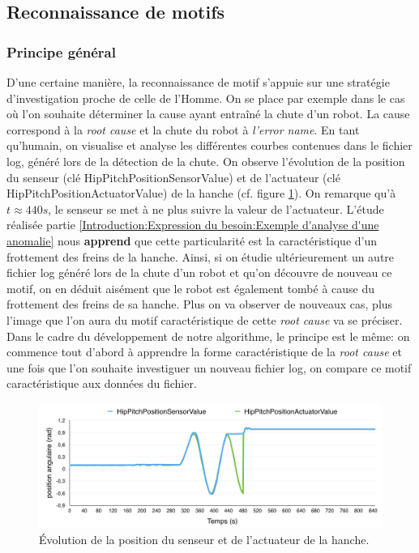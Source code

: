 \subsection{Reconnaissance de motifs}
\label{Automatisation du processus d'investigation: Reconnaissance de motifs}

\subsubsection{Principe général}
\label{Automatisation du processus d'investigation: Reconnaissance de motifs: Principes généraux}
D'une certaine manière, la reconnaissance de motif s'appuie sur une stratégie d'investigation proche de celle de l'Homme. On se place par exemple dans le cas où l'on souhaite déterminer la cause ayant entraîné la chute d'un robot. La cause correspond à la \emph{root cause} et la chute du robot à \emph{l'error name}. En tant qu'humain, on visualise et analyse les différentes courbes contenues dans le fichier log, généré lors de la détection de la chute. On observe l'évolution de la position du senseur (clé HipPitchPositionSensorValue) et de l'actuateur (clé HipPitchPositionActuatorValue) de la hanche (cf. figure \ref{fig:Évolution de la position du senseur et de l'actuateur de la hanche}). On remarque qu'à $t \approx 440 s$, le senseur se met à ne plus suivre la valeur de l'actuateur. L'étude réalisée partie \ref{Introduction:Expression du besoin:Exemple d'analyse d'une anomalie} nous \textbf{apprend} que cette particularité est la caractéristique d'un frottement des freins de la hanche. Ainsi, si on étudie ultérieurement un autre fichier log généré lors de la chute d'un robot et qu'on découvre de nouveau ce motif, on en déduit aisément que le robot est également tombé à cause du frottement des freins de sa hanche. Plus on va observer de nouveaux cas, plus l'image que l'on aura du motif caractéristique de cette \emph{root cause} va se préciser.\\
Dans le cadre du développement de notre algorithme, le principe est le même: on commence tout d'abord à apprendre la forme caractéristique de la\emph{ root cause} et une fois que l'on souhaite investiguer un nouveau fichier log, on compare ce motif caractéristique aux données du fichier. 

\begin{figure}[h]
	\centering\includegraphics[width=15cm]{images/HipPitch.png}
	\caption[Évolution de la position du senseur et de l'actuateur de la hanche]{Évolution de la position du senseur et de l'actuateur de la hanche.}
	\label{fig:Évolution de la position du senseur et de l'actuateur de la hanche}
\end{figure}

